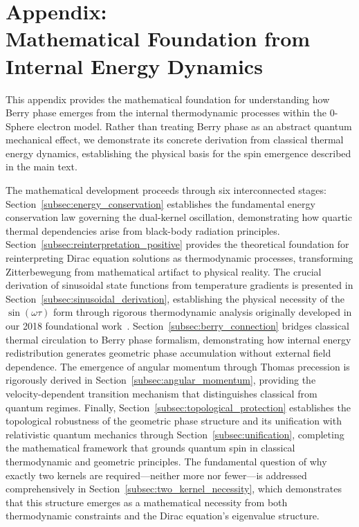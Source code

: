 \documentclass[%
 reprint,
 amsmath,amssymb,
 aps,
]{revtex4-1}
\numberwithin{equation}{section}%
\begin{document}
\section{Appendix:\\ Mathematical Foundation from Internal Energy Dynamics}
\label{sec:appendix}

This appendix provides the mathematical foundation for understanding how Berry phase emerges from the internal thermodynamic processes within the 0-Sphere electron model. Rather than treating Berry phase as an abstract quantum mechanical effect, we demonstrate its concrete derivation from classical thermal energy dynamics, establishing the physical basis for the spin emergence described in the main text.

The mathematical development proceeds through six interconnected stages: Section~\ref{subsec:energy_conservation} establishes the fundamental energy conservation law governing the dual-kernel oscillation, demonstrating how quartic thermal dependencies arise from black-body radiation principles. Section~\ref{subsec:reinterpretation_positive} provides the theoretical foundation for reinterpreting Dirac equation solutions as thermodynamic processes, transforming Zitterbewegung from mathematical artifact to physical reality. The crucial derivation of sinusoidal state functions from temperature gradients is presented in Section~\ref{subsec:sinusoidal_derivation}, establishing the physical necessity of the $\sin(\omega\tau)$ form through rigorous thermodynamic analysis originally developed in our 2018 foundational work~\cite{hanamura1811.0312}. Section~\ref{subsec:berry_connection} bridges classical thermal circulation to Berry phase formalism, demonstrating how internal energy redistribution generates geometric phase accumulation without external field dependence. The emergence of angular momentum through Thomas precession is rigorously derived in Section~\ref{subsec:angular_momentum}, providing the velocity-dependent transition mechanism that distinguishes classical from quantum regimes. Finally, Section~\ref{subsec:topological_protection} establishes the topological robustness of the geometric phase structure and its unification with relativistic quantum mechanics through Section~\ref{subsec:unification}, completing the mathematical framework that grounds quantum spin in classical thermodynamic and geometric principles. The fundamental question of why exactly two kernels are required—neither more nor fewer—is addressed comprehensively in Section~\ref{subsec:two_kernel_necessity}, which demonstrates that this structure emerges as a mathematical necessity from both thermodynamic constraints and the Dirac equation's eigenvalue structure.
\end{document}

